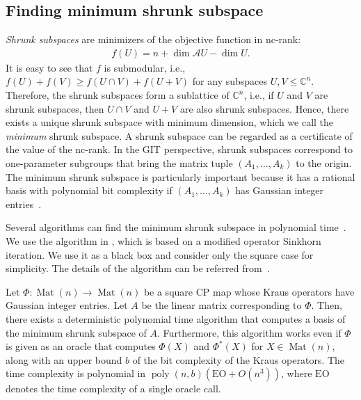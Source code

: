 \documentclass[a4paper,11pt]{article}
\numberwithin{equation}{section}
\newcommand{\C}{\mathbb{C}}
\newcommand{\caA}{\mathcal{A}}
\DeclareMathOperator{\Mat}{Mat}
\DeclareMathOperator{\poly}{poly}
\begin{document}
\subsection{Finding minimum shrunk subspace}
\emph{Shrunk subspaces} are minimizers of the objective function in nc-rank:
\begin{align}
    f(U) = n + \dim\caA U - \dim U.
\end{align}
It is easy to see that $f$ is submodular, i.e., $f(U) + f(V) \geq f(U \cap V) + f(U + V)$ for any subspaces $U, V \leq \C^n$.
Therefore, the shrunk subspaces form a sublattice of $\C^n$, i.e., if $U$ and $V$ are shrunk subspaces, then $U \cap V$ and $U + V$ are also shrunk subspaces.
Hence, there exists a unique shrunk subspace with minimum dimension, which we call the \emph{minimum} shrunk subspace.
A shrunk subspace can be regarded as a certificate of the value of the nc-rank.
In the GIT perspective, shrunk subspaces correspond to one-parameter subgroups that bring the matrix tuple $(A_1, \dots, A_k)$ to the origin.
The minimum shrunk subspace is particularly important because it has a rational basis with polynomial bit complexity if $(A_1, \dots, A_k)$ has Gaussian integer entries~\cite{Ivanyos2018}.

Several algorithms can find the minimum shrunk subspace in polynomial time~\cite{Ivanyos2018,Franks2023}.
We use the algorithm in \cite{Franks2023}, which is based on a modified operator Sinkhorn iteration. We use it as a black box and 
consider only the square case for simplicity.
The details of the algorithm can be referred from~\cite{Franks2023}.

\begin{theorem}\label{thm:shrunk}
    Let $\Phi: \Mat(n) \to \Mat(n)$ be a square CP map whose Kraus operators have Gaussian integer entries.
    Let $A$ be the linear matrix corresponding to $\Phi$.
    Then, there exists a deterministic polynomial time algorithm that computes a basis of the minimum shrunk subspace of $A$. 
    Furthermore, this algorithm works even if $\Phi$ is given as an oracle that computes $\Phi(X)$ and $\Phi^*(X)$ for $X \in \Mat(n)$, along with an upper bound $b$ of the bit complexity of the Kraus operators.
    The time complexity is polynomial in $\poly(n, b)(\mathrm{EO} + O(n^3))$, where $\mathrm{EO}$ denotes the time complexity of a single oracle call. 
\end{theorem}
\end{document}
